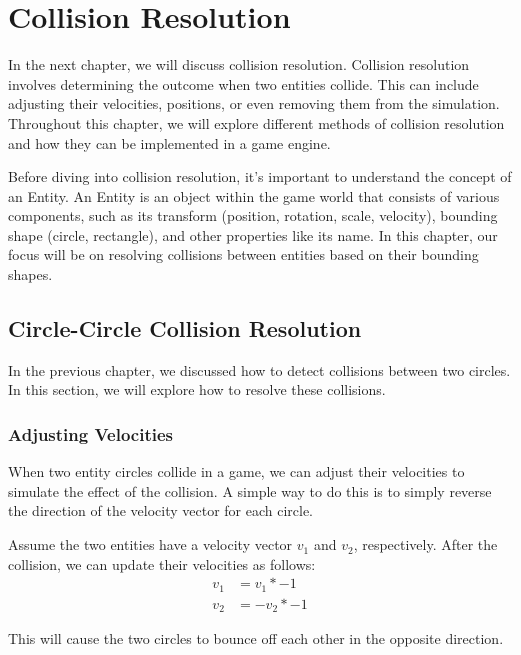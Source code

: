 \chapter{Collision Resolution}
In the next chapter, we will discuss collision resolution. Collision resolution
involves determining the outcome when two entities collide. This can include
adjusting their velocities, positions, or even removing them from the
simulation. Throughout this chapter, we will explore different methods of
collision resolution and how they can be implemented in a game engine.

Before diving into collision resolution, it's important to understand the
concept of an Entity. An Entity is an object within the game world that
consists of various components, such as its transform (position, rotation,
scale, velocity), bounding shape (circle, rectangle), and other properties like
its name. In this chapter, our focus will be on resolving collisions between
entities based on their bounding shapes.

\section{Circle-Circle Collision Resolution}
In the previous chapter, we discussed how to detect collisions between two
circles. In this section, we will explore how to resolve these collisions.

\subsection{Adjusting Velocities}
When two entity circles collide in a game, we can adjust their velocities to
simulate the effect of the collision. A simple way to do this is to simply
reverse the direction of the velocity vector for each circle.

Assume the two entities have a velocity vector $v_1$ and $v_2$, respectively.
After the collision, we can update their velocities as follows:
\begin{equation}
    \begin{aligned}
        v_1 & = v_1 * -1  \\
        v_2 & = -v_2 * -1
    \end{aligned}
\end{equation}

This will cause the two circles to bounce off each other in the opposite
direction.

